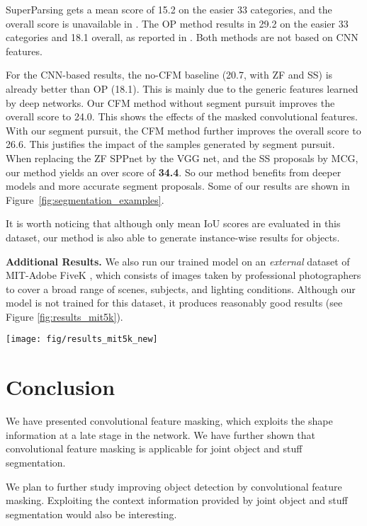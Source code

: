 \documentclass[10pt,twocolumn,letterpaper]{article}
\begin{document}
SuperParsing \cite{tighe2010superparsing} gets a mean score of 15.2 on the easier 33 categories, and the overall score is unavailable in \cite{mottaghi2014role}. The OP method \cite{carreira2012semantic} results in 29.2 on the easier 33 categories and 18.1 overall, as reported in \cite{mottaghi2014role}. Both methods are not based on CNN features.

For the CNN-based results, the no-CFM baseline (20.7, with ZF and SS) is already better than OP (18.1). This is mainly due to the generic features learned by deep networks. Our CFM method without segment pursuit improves the overall score to 24.0. This shows the effects of the masked convolutional features. With our segment pursuit, the CFM method further improves the overall score to 26.6. This justifies the impact of the samples generated by segment pursuit. When replacing the ZF SPPnet by the VGG net, and the SS proposals by MCG, our method yields an over score of \textbf{34.4}. So our method benefits from deeper models and more accurate segment proposals.
Some of our results are shown in Figure~\ref{fig:segmentation_examples}.

It is worth noticing that although only mean IoU scores are evaluated in this dataset, our method is also able to generate instance-wise results for objects.

\vspace{6pt}
\noindent\textbf{Additional Results.}
We also run our trained model on an \emph{external} dataset of MIT-Adobe FiveK \cite{vladimir2011fivek}, which consists of images taken by professional photographers to cover a broad range of scenes, subjects, and lighting conditions. Although our model is not trained for this dataset, it produces reasonably good results (see Figure \ref{fig:results_mit5k}).

\begin{figure*}[t]
\centering
\texttt{[image: fig/results\_mit5k\_new]}
\caption{Some visual results of our trained model (with VGG and MCG) for \textbf{cross-dataset joint object and stuff segmentation}. The network is trained on the PASCAL-CONTEXT training set \cite{mottaghi2014role}, and is applied on MIT-Adobe FiveK \cite{vladimir2011fivek}.}
\label{fig:results_mit5k}
\end{figure*}

\section{Conclusion}

We have presented convolutional feature masking, which exploits the shape information at a late stage in the network. We have further shown that convolutional feature masking is applicable for joint object and stuff segmentation.

We plan to further study improving object detection by convolutional feature masking.
Exploiting the context information provided by joint object and stuff segmentation would also be interesting.

{\small


}
\end{document}
